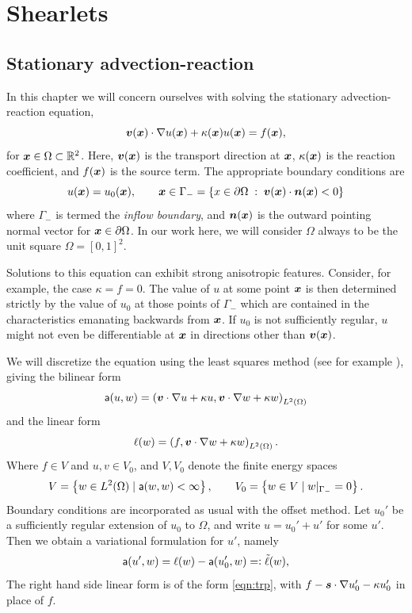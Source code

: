 \chapter{Shearlets}

\label{chap:shearlets}

\section{Stationary advection-reaction} \label{sec:eqndiscr}

In this chapter we will concern ourselves with solving the stationary advection-reaction equation,
\begin{equation} \label{eqn:trp}
{\bm v}({\bm x})\cdot\nabla u({\bm x}) + \kappa({\bm x})u({\bm x}) = f({\bm x}),
\end{equation}
for ${\bm x}\in\Omega\subset\mathbb{R}^2$. Here, ${\bm v}({\bm x})$ is the transport direction at ${\bm x}$, $\kappa({\bm x})$ is the
reaction coefficient, and $f({\bm x})$ is the source term. The appropriate boundary conditions are
\[
    u({\bm x}) = u_0({\bm x}), \qquad {\bm x}\in\Gamma_- = \{x \in \partial\Omega \;:\; {\bm v}({\bm x})\cdot {\bm n}({\bm x}) < 0\}
\]
where $\Gamma_-$ is termed the {\em inflow boundary}, and ${\bm n}({\bm x})$ is the outward pointing normal vector for
${\bm x}\in\partial\Omega$. In our work here, we will consider $\Omega$ always to be the unit square
$\Omega=[0,1]^2$.

Solutions to this equation can exhibit strong anisotropic features. Consider, for example, the case
$\kappa=f=0$. The value of $u$ at some point ${\bm x}$ is then determined strictly by the value of $u_0$ at those
points of $\Gamma_-$ which are contained in the characteristics emanating backwards from ${\bm x}$. If $u_0$ is
not sufficiently regular, $u$ might not even be differentiable at ${\bm x}$ in directions other than ${\bm v}({\bm x})$.

We will discretize the equation using the least squares method (see
for example \cite{Widmer2008saf}), giving the bilinear form
\[ 
    {\sf a}(u,w) = \left({\bm v}\cdot\nabla u + \kappa u, {\bm v}\cdot\nabla w + \kappa w\right)_{L^2(\Omega)}
\]
and the linear form
\begin{equation} \label{eqn:ell}
    {\ell}(w) = \left(f, {\bm v}\cdot\nabla w + \kappa w\right)_{L^2(\Omega)}.
\end{equation}
Where $f\in V$ and $u,v \in V_0$, and $V,V_0$ denote the finite energy spaces
\[
    V   = \left\{ w \in L^2(\Omega) \;|\; {\sf a}(w,w) < \infty \right\}, \qquad
    V_0 = \left\{ w \in V \;|\; w|_{\Gamma_-} = 0 \right\}.
\]
Boundary conditions are incorporated as usual with the offset method. Let $u_0'$ be a sufficiently regular
extension of $u_0$ to $\Omega$, and write $u=u_0' + u'$ for some $u'$. Then we obtain a variational
formulation for $u'$, namely
\[
    {\sf a}(u',w) = \ell(w) - {\sf a}(u_0',w) =\vcentcolon \tilde{\ell}(w),
\]
The right hand side linear form is of the form \eqref{eqn:trp}, with $f - {\bm s}\cdot\nabla u_0' - \kappa u_0'$
in place of $f$.

